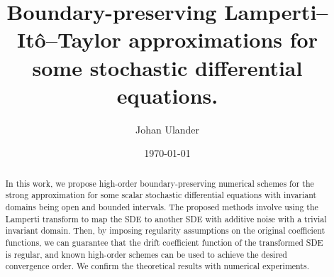 \documentclass[11pt]{amsart}
\title[]{Boundary-preserving Lamperti--Itô--Taylor approximations for some stochastic differential equations.}
\date{\today}
\author{Johan Ulander}
\begin{document}
\begin{abstract}
In this work, we propose high-order boundary-preserving numerical schemes for the strong approximation for some scalar stochastic differential equations with invariant domains being open and bounded intervals. The proposed methods involve using the Lamperti transform to map the SDE to another SDE with additive noise with a trivial invariant domain. Then, by imposing regularity assumptions on the original coefficient functions, we can guarantee that the drift coefficient function of the transformed SDE is regular, and known high-order schemes can be used to achieve the desired convergence order. We confirm the theoretical results with numerical experiments.
\end{abstract}

\maketitle
\end{document}
